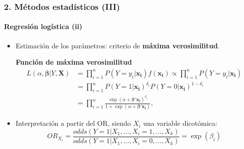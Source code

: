 \documentclass{beamer}
\begin{document}
\begin{frame}
\frametitle{2. Métodos estadísticos (III)}
\framesubtitle{Regresión logística (ii)}
	\begin{itemize}\itemsep8pt
		\vspace{-0.2cm}
  	\item Estimación de los parámetros: criterio de {\color{green!55!blue} \textbf{máxima verosimilitud}}.
	\begin{block}{\textbf{Función de máxima verosimilitud}}
		\small
		\vspace{-0.5cm}
		\begin{align*}
		L(\alpha, \boldsymbol{\beta} | Y, \boldsymbol{X})
		&=\prod_{i=1}^{n}P(Y=y_i|\boldsymbol{x_i})f(\boldsymbol{x_i})\propto \prod_{i=1}^{n}P(Y=y_i|\boldsymbol{x_i})\\
		&=\prod_{i=1}^{n}P(Y=1|\boldsymbol{x_i})^{\delta_i}P(Y=0|\boldsymbol{x_i})^{1-\delta_i} \\
		& =\prod_{i=1}^{n}\frac{\exp(\alpha + \boldsymbol{\beta'x_i})^{\delta_i}}{1+\exp(\alpha + \boldsymbol{\beta'x_i})},
		\end{align*}
		\normalsize
	\end{block}
	
	\item Interpretación a partir del OR, siendo $X_i$ una variable dicotómica:
			\small
		\hspace{-0.5cm}
		$$OR_{X_i}= \frac{odds(Y=1|X_1,..., X_i=1, ... , X_k)}{odds(Y=1|X_1,..., X_i=0, ... , X_k)} = \exp(\beta_i)$$
		\normalsize
	\end{itemize}
\end{frame}


\end{document}
